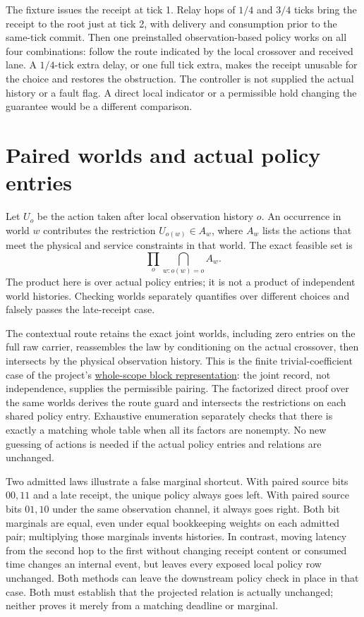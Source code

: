\documentclass[11pt]{article}
\begin{document}
The fixture issues the receipt at tick 1. Relay hops of \(1/4\) and \(3/4\) ticks bring the receipt to the root just at tick 2, with delivery and consumption prior to the same-tick commit. Then one preinstalled observation-based policy works on all four combinations: follow the route indicated by the local crossover and received lane. A \(1/4\)-tick extra delay, or one full tick extra, makes the receipt unusable for the choice and restores the obstruction. The controller is not supplied the actual history or a fault flag. A direct local indicator or a permissible hold changing the guarantee would be a different comparison.

\section{Paired worlds and actual policy entries}
Let \(U_o\) be the action taken after local observation history \(o\). An occurrence in world \(w\) contributes the restriction \(U_{o(w)}\in A_w\), where \(A_w\) lists the actions that meet the physical and service constraints in that world. The exact feasible set is
\[
                 \prod_o \bigcap_{w:o(w)=o} A_w .
\]
The product here is over actual policy entries; it is not a product of independent world histories. Checking worlds separately quantifies over different choices and falsely passes the late-receipt case.

The contextual route retains the exact joint worlds, including zero entries on the full raw carrier, reassembles the law by conditioning on the actual crossover, then intersects by the physical observation history. This is the finite trivial-coefficient case of the project's \href{https://github.com/eternal-november/eos-research-programmes/blob/e1348964f73704212d2d8b48d5982a5ed600a2ff/projects/contextual-composition/foundations/shared-world-native-assembly/Whole_Scope_Block_Decomposition.tex\#L44-L62}{whole-scope block representation}: the joint record, not independence, supplies the permissible pairing. The factorized direct proof over the same worlds derives the route guard and intersects the restrictions on each shared policy entry. Exhaustive enumeration separately checks that there is exactly a matching whole table when all its factors are nonempty. No new guessing of actions is needed if the actual policy entries and relations are unchanged.

Two admitted laws illustrate a false marginal shortcut. With paired source bits \(00,11\) and a late receipt, the unique policy always goes left. With paired source bits \(01,10\) under the same observation channel, it always goes right. Both bit marginals are equal, even under equal bookkeeping weights on each admitted pair; multiplying those marginals invents histories. In contrast, moving latency from the second hop to the first without changing receipt content or consumed time changes an internal event, but leaves every exposed local policy row unchanged. Both methods can leave the downstream policy check in place in that case. Both must establish that the projected relation is actually unchanged; neither proves it merely from a matching deadline or marginal.
\end{document}
